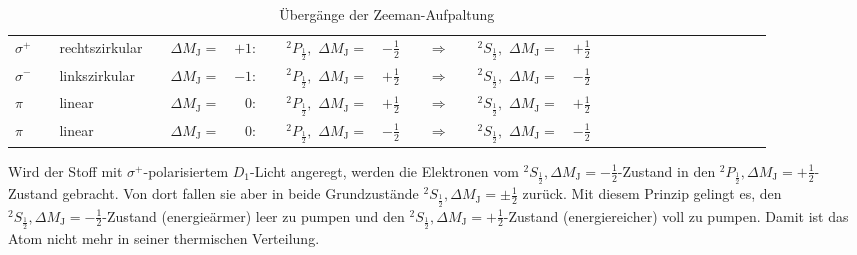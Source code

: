 \begin{table}[h!]
  \centering
  \caption{Übergänge der Zeeman-Aufpaltung}
  \label{tab:polarisation}
  \begin{tabular}{l l l l l r l l r l c l l r l l l l l l l l l l l l}
    \toprule
$\sigma^{+}$ && rechtszirkular && $\Delta M_{\text{J}}=$ & $+1:$  &&  $^{2}P_{\frac{1}{2}},$ $\Delta M_{\text{J}}=$ & $-\frac{1}{2}$ &&$\Rightarrow$&& $^{2}S_{\frac{1}{2}},$ $\Delta M_{\text{J}}=$ & $+\frac{1}{2}$ \\
$\sigma^{-}$ && linkszirkular  && $\Delta M_{\text{J}}=$ & $-1:$  &&  $^{2}P_{\frac{1}{2}},$ $\Delta M_{\text{J}}=$ & $+\frac{1}{2}$  &&$\Rightarrow$&& $^{2}S_{\frac{1}{2}},$ $\Delta M_{\text{J}}=$ & $-\frac{1}{2}$ \\
$\pi       $ && linear         && $\Delta M_{\text{J}}=$ & $ 0:$  &&  $^{2}P_{\frac{1}{2}},$ $\Delta M_{\text{J}}=$ & $+\frac{1}{2}$  &&$\Rightarrow$&& $^{2}S_{\frac{1}{2}},$ $\Delta M_{\text{J}}=$ & $+\frac{1}{2}$ \\
$\pi$        && linear         && $\Delta M_{\text{J}}=$ & $ 0:$  &&  $^{2}P_{\frac{1}{2}},$ $\Delta M_{\text{J}}=$ & $-\frac{1}{2}$ &&$\Rightarrow$&& $^{2}S_{\frac{1}{2}},$ $\Delta M_{\text{J}}=$ & $-\frac{1}{2}$ \\
    \bottomrule
  \end{tabular}
\end{table}
Wird der Stoff mit $\sigma^{+}$-polarisiertem $D_{1}$-Licht angeregt, werden die Elektronen vom $^{2}S_{\frac{1}{2}}, \Delta M_{\text{J}}= -\frac{1}{2}$-Zustand in den $^{2}P_{\frac{1}{2}}, \Delta M_{\text{J}}= +\frac{1}{2}$-Zustand gebracht.
Von dort fallen sie aber in beide Grundzustände $^{2}S_{\frac{1}{2}}, \Delta M_{\text{J}}= \pm \frac{1}{2}$ zurück.
Mit diesem Prinzip gelingt es, den $^{2}S_{\frac{1}{2}}, \Delta M_{\text{J}}= -\frac{1}{2}$-Zustand (energieärmer) leer zu pumpen und den $^{2}S_{\frac{1}{2}}, \Delta M_{\text{J}}= +\frac{1}{2}$-Zustand (energiereicher) voll zu pumpen.
Damit ist das Atom nicht mehr in seiner thermischen Verteilung.
